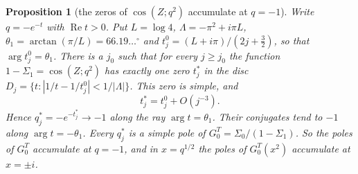 \documentclass[11pt]{article}
\theoremstyle{plain}
\newtheorem{proposition}[theorem]{Proposition}
\theoremstyle{definition}
\theoremstyle{remark}
\renewcommand{\Re}{\operatorname{Re}}
\theoremstyle{plain}\newtheorem*{maintheorem}{Main Theorem}
\begin{document}
\begin{proposition}[the zeros of $\cos(Z;q^2)$ accumulate at $q=-1$]\label{prop:minusone}
Write $q=-e^{-t}$ with $\Re t>0$. Put $L=\log4$, $\Lambda=-\pi^2+i\pi L$,
$\theta_1=\arctan(\pi/L)=66.19\ldots^\circ$ and $t^0_j=(L+i\pi)/(2j+\tfrac32)$, so that
$\arg t^0_j=\theta_1$. There is a $j_0$ such that for every $j\ge j_0$ the function
$1-\Sigma_1=\cos(Z;q^2)$ has exactly one zero $t^\ast_j$ in the disc
$D_j=\{t:|1/t-1/t^0_j|<1/|\Lambda|\}$. This zero is simple, and
\[
   t^\ast_j=t^0_j+O(j^{-3}) .
\]
Hence $q^\ast_j=-e^{-t^\ast_j}\to-1$ along the ray $\arg t=\theta_1$. Their conjugates tend to $-1$
along $\arg t=-\theta_1$. Every $q^\ast_j$ is a simple pole of $G^T_0=\Sigma_0/(1-\Sigma_1)$. So the
poles of $G^T_0$ accumulate at $q=-1$, and in $x=q^{1/2}$ the poles of $G^T_0(x^2)$ accumulate at
$x=\pm i$.
\end{proposition}
\end{document}
